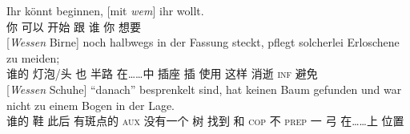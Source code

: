 \eal
\ex 
\gll Ihr könnt beginnen, [mit  \emph{wem}] ihr wollt.\footnotemark\\
     你 可以    开始    \hspaceThis{[}跟 谁 你 想要\\
\ex 
\gll {}[\emph{Wessen}      Birne]    noch halbwegs in der Fassung steckt, pflegt solcherlei Erloschene zu meiden;\footnotemark\\
       \hspaceThis{[}谁的 灯泡/头 也  半路  在……中  插座  插      使用  这样      消逝    \textsc{inf} 避免\\
\ex 
\gll {}[\emph{Wessen}     Schuhe] "`danach"'  besprenkelt sind, hat keinen Baum gefunden und war nicht zu einem Bogen in der Lage.\footnotemark\\
       \hspaceThis{[}谁的  鞋      此后 有斑点的    \passiveprs{}   \textsc{aux} 没有一个   树 找到    和 \textsc{cop} 不   \textsc{prep} 一     弓   在……上  位置\\
\zl
%
